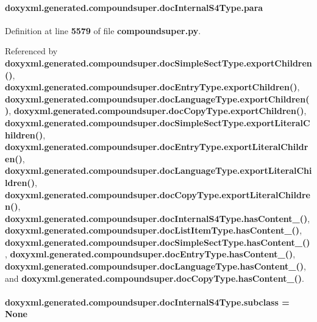 \paragraph[{para}]{\setlength{\rightskip}{0pt plus 5cm}doxyxml.\+generated.\+compoundsuper.\+doc\+Internal\+S4\+Type.\+para}\label{classdoxyxml_1_1generated_1_1compoundsuper_1_1docInternalS4Type_a447824cec1d76899e1ca9fee68578699}


Definition at line {\bf 5579} of file {\bf compoundsuper.\+py}.



Referenced by {\bf doxyxml.\+generated.\+compoundsuper.\+doc\+Simple\+Sect\+Type.\+export\+Children()}, {\bf doxyxml.\+generated.\+compoundsuper.\+doc\+Entry\+Type.\+export\+Children()}, {\bf doxyxml.\+generated.\+compoundsuper.\+doc\+Language\+Type.\+export\+Children()}, {\bf doxyxml.\+generated.\+compoundsuper.\+doc\+Copy\+Type.\+export\+Children()}, {\bf doxyxml.\+generated.\+compoundsuper.\+doc\+Simple\+Sect\+Type.\+export\+Literal\+Children()}, {\bf doxyxml.\+generated.\+compoundsuper.\+doc\+Entry\+Type.\+export\+Literal\+Children()}, {\bf doxyxml.\+generated.\+compoundsuper.\+doc\+Language\+Type.\+export\+Literal\+Children()}, {\bf doxyxml.\+generated.\+compoundsuper.\+doc\+Copy\+Type.\+export\+Literal\+Children()}, {\bf doxyxml.\+generated.\+compoundsuper.\+doc\+Internal\+S4\+Type.\+has\+Content\+\_\+()}, {\bf doxyxml.\+generated.\+compoundsuper.\+doc\+List\+Item\+Type.\+has\+Content\+\_\+()}, {\bf doxyxml.\+generated.\+compoundsuper.\+doc\+Simple\+Sect\+Type.\+has\+Content\+\_\+()}, {\bf doxyxml.\+generated.\+compoundsuper.\+doc\+Entry\+Type.\+has\+Content\+\_\+()}, {\bf doxyxml.\+generated.\+compoundsuper.\+doc\+Language\+Type.\+has\+Content\+\_\+()}, and {\bf doxyxml.\+generated.\+compoundsuper.\+doc\+Copy\+Type.\+has\+Content\+\_\+()}.

\paragraph[{subclass}]{\setlength{\rightskip}{0pt plus 5cm}doxyxml.\+generated.\+compoundsuper.\+doc\+Internal\+S4\+Type.\+subclass = None\hspace{0.3cm}{\ttfamily [static]}}\label{classdoxyxml_1_1generated_1_1compoundsuper_1_1docInternalS4Type_a8c5d46b657cabb8940c768d7fc280a19}


